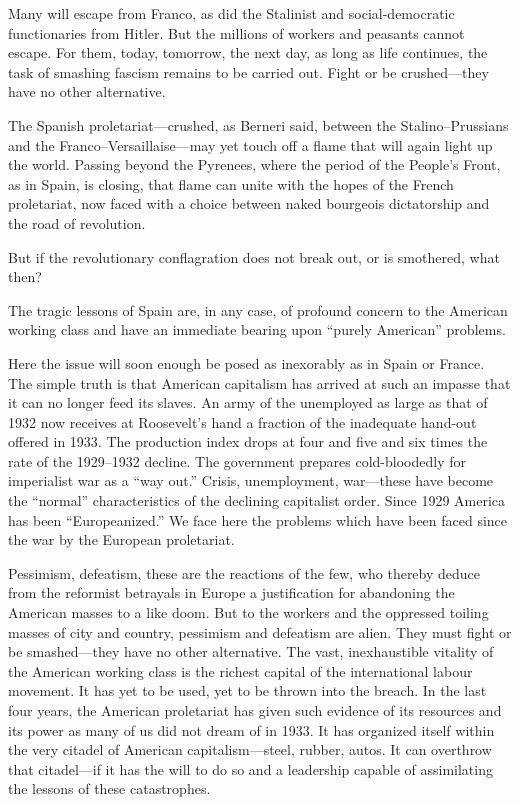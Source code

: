 Many will escape from Franco, as did the Stalinist and social-democratic functionaries from Hitler. But the millions of workers and peasants cannot escape. For them, today, tomorrow, the next day, as long as life continues, the task of smashing fascism remains to be carried out. Fight or be crushed---they have no other alternative.

The Spanish proletariat---crushed, as Berneri said, between the Stalino--Prussians and the Franco--Versaillaise---may yet touch off a flame that will again light up the world. Passing beyond the Pyrenees, where the period of the People’s Front, as in Spain, is closing, that flame can unite with the hopes of the French proletariat, now faced with a choice between naked bourgeois dictatorship and the road of revolution.

But if the revolutionary conflagration does not break out, or is smothered, what then?

The tragic lessons of Spain are, in any case, of profound concern to the American working class and have an immediate bearing upon ``purely American'' problems.

Here the issue will soon enough be posed as inexorably as in Spain or France. The simple truth is that American capitalism has arrived at such an impasse that it can no longer feed its slaves. An army of the unemployed as large as that of 1932 now receives at Roosevelt’s hand a fraction of the inadequate hand-out offered in 1933. The production index drops at four and five and six times the rate of the 1929--1932 decline. The government prepares cold-bloodedly for imperialist war as a ``way out.'' Crisis, unemployment, war---these have become the ``normal'' characteristics of the declining capitalist order. Since 1929 America has been ``Europeanized.'' We face here the problems which have been faced since the war by the European proletariat.

Pessimism, defeatism, these are the reactions of the few, who thereby deduce from the reformist betrayals in Europe a justification for abandoning the American masses to a like doom. But to the workers and the oppressed toiling masses of city and country, pessimism and defeatism are alien. They must fight or be smashed---they have no other alternative. The vast, inexhaustible vitality of the American working class is the richest capital of the international labour movement. It has yet to be used, yet to be thrown into the breach. In the last four years, the American proletariat has given such evidence of its resources and its power as many of us did not dream of in 1933. It has organized itself within the very citadel of American capitalism---steel, rubber, autos. It can overthrow that citadel---if it has the will to do so and a leadership capable of assimilating the lessons of these catastrophes.

